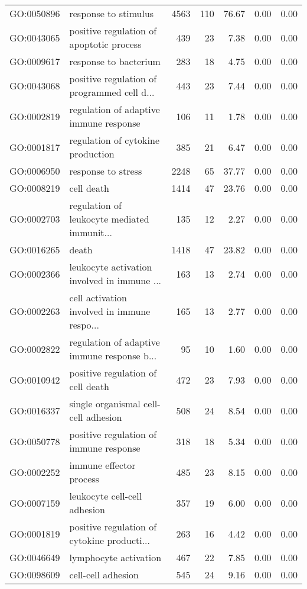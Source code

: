 \begin{table}[ht]
\begin{tabular}{llrrrrr}
  GO:0050896 & response to stimulus & 4563 & 110 & 76.67 & 0.00 & 0.00 \\ 
  GO:0043065 & positive regulation of apoptotic process & 439 &  23 & 7.38 & 0.00 & 0.00 \\ 
  GO:0009617 & response to bacterium & 283 &  18 & 4.75 & 0.00 & 0.00 \\ 
  GO:0043068 & positive regulation of programmed cell d... & 443 &  23 & 7.44 & 0.00 & 0.00 \\ 
  GO:0002819 & regulation of adaptive immune response & 106 &  11 & 1.78 & 0.00 & 0.00 \\ 
  GO:0001817 & regulation of cytokine production & 385 &  21 & 6.47 & 0.00 & 0.00 \\ 
  GO:0006950 & response to stress & 2248 &  65 & 37.77 & 0.00 & 0.00 \\ 
  GO:0008219 & cell death & 1414 &  47 & 23.76 & 0.00 & 0.00 \\ 
  GO:0002703 & regulation of leukocyte mediated immunit... & 135 &  12 & 2.27 & 0.00 & 0.00 \\ 
  GO:0016265 & death & 1418 &  47 & 23.82 & 0.00 & 0.00 \\ 
  GO:0002366 & leukocyte activation involved in immune ... & 163 &  13 & 2.74 & 0.00 & 0.00 \\ 
  GO:0002263 & cell activation involved in immune respo... & 165 &  13 & 2.77 & 0.00 & 0.00 \\ 
  GO:0002822 & regulation of adaptive immune response b... &  95 &  10 & 1.60 & 0.00 & 0.00 \\ 
  GO:0010942 & positive regulation of cell death & 472 &  23 & 7.93 & 0.00 & 0.00 \\ 
  GO:0016337 & single organismal cell-cell adhesion & 508 &  24 & 8.54 & 0.00 & 0.00 \\ 
  GO:0050778 & positive regulation of immune response & 318 &  18 & 5.34 & 0.00 & 0.00 \\ 
  GO:0002252 & immune effector process & 485 &  23 & 8.15 & 0.00 & 0.00 \\ 
  GO:0007159 & leukocyte cell-cell adhesion & 357 &  19 & 6.00 & 0.00 & 0.00 \\ 
  GO:0001819 & positive regulation of cytokine producti... & 263 &  16 & 4.42 & 0.00 & 0.00 \\ 
  GO:0046649 & lymphocyte activation & 467 &  22 & 7.85 & 0.00 & 0.00 \\ 
  GO:0098609 & cell-cell adhesion & 545 &  24 & 9.16 & 0.00 & 0.00 \\ 

\end{tabular}
\end{table}

